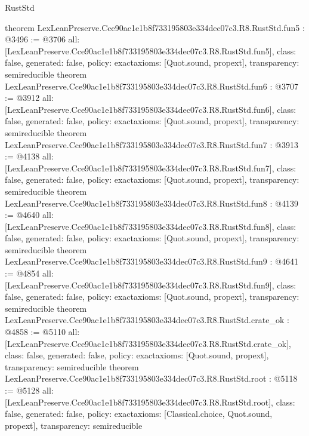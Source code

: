 \begin{lexlean}{RustStd}
\begin{coremodule}
{}
theorem LexLeanPreserve.Cce90ac1e1b8f733195803e334dec07c3.R8.RustStd.fun5 : @3496 := @3706 {
  all: [LexLeanPreserve.Cce90ac1e1b8f733195803e334dec07c3.R8.RustStd.fun5],
  class: false,
  generated: false,
  policy: exact{axioms: [Quot.sound, propext]},
  transparency: semireducible
}
theorem LexLeanPreserve.Cce90ac1e1b8f733195803e334dec07c3.R8.RustStd.fun6 : @3707 := @3912 {
  all: [LexLeanPreserve.Cce90ac1e1b8f733195803e334dec07c3.R8.RustStd.fun6],
  class: false,
  generated: false,
  policy: exact{axioms: [Quot.sound, propext]},
  transparency: semireducible
}
theorem LexLeanPreserve.Cce90ac1e1b8f733195803e334dec07c3.R8.RustStd.fun7 : @3913 := @4138 {
  all: [LexLeanPreserve.Cce90ac1e1b8f733195803e334dec07c3.R8.RustStd.fun7],
  class: false,
  generated: false,
  policy: exact{axioms: [Quot.sound, propext]},
  transparency: semireducible
}
theorem LexLeanPreserve.Cce90ac1e1b8f733195803e334dec07c3.R8.RustStd.fun8 : @4139 := @4640 {
  all: [LexLeanPreserve.Cce90ac1e1b8f733195803e334dec07c3.R8.RustStd.fun8],
  class: false,
  generated: false,
  policy: exact{axioms: [Quot.sound, propext]},
  transparency: semireducible
}
theorem LexLeanPreserve.Cce90ac1e1b8f733195803e334dec07c3.R8.RustStd.fun9 : @4641 := @4854 {
  all: [LexLeanPreserve.Cce90ac1e1b8f733195803e334dec07c3.R8.RustStd.fun9],
  class: false,
  generated: false,
  policy: exact{axioms: [Quot.sound, propext]},
  transparency: semireducible
}
theorem LexLeanPreserve.Cce90ac1e1b8f733195803e334dec07c3.R8.RustStd.crate_ok : @4858 := @5110 {
  all: [LexLeanPreserve.Cce90ac1e1b8f733195803e334dec07c3.R8.RustStd.crate_ok],
  class: false,
  generated: false,
  policy: exact{axioms: [Quot.sound, propext]},
  transparency: semireducible
}
theorem LexLeanPreserve.Cce90ac1e1b8f733195803e334dec07c3.R8.RustStd.root : @5118 := @5128 {
  all: [LexLeanPreserve.Cce90ac1e1b8f733195803e334dec07c3.R8.RustStd.root],
  class: false,
  generated: false,
  policy: exact{axioms: [Classical.choice, Quot.sound, propext]},
  transparency: semireducible
}


\end{coremodule}
\end{lexlean}
